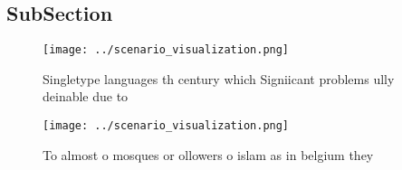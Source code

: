 \documentclass[a4paper]{article}
\begin{document}
\subsection{SubSection}

\begin{figure}
\centering
\texttt{[image: ../scenario\_visualization.png]}
\caption{Singletype languages th century which Signiicant problems ully deinable due to 
}
\end{figure}
 
\begin{figure}
\centering
\texttt{[image: ../scenario\_visualization.png]}
\caption{To almost o mosques or ollowers o islam as in belgium they 
}
\end{figure}
 
\end{document}
